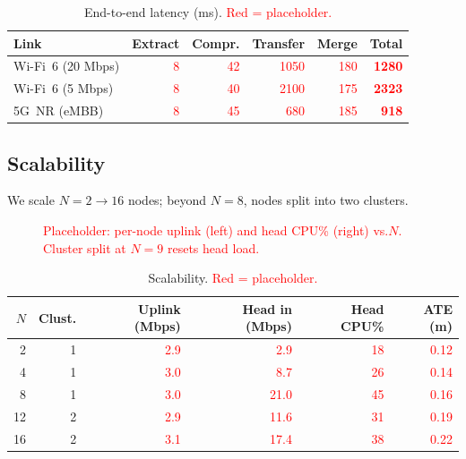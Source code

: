 \begin{table}[t]
  \centering
  \caption{End-to-end latency (ms). \textcolor{red}{Red = placeholder.}}
  \label{tab:latency}
  \footnotesize
  \setlength{\tabcolsep}{4pt}
  \begin{tabular}{@{}lrrrrr@{}}
    \toprule
    Link & Extract & Compr.\@ & Transfer & Merge & \textbf{Total} \\
    \midrule
    Wi-Fi~6 (20 Mbps) & \textcolor{red}{8} & \textcolor{red}{42} & \textcolor{red}{1050} & \textcolor{red}{180} & \textcolor{red}{\textbf{1280}} \\
    Wi-Fi~6 (5 Mbps)  & \textcolor{red}{8} & \textcolor{red}{40} & \textcolor{red}{2100} & \textcolor{red}{175} & \textcolor{red}{\textbf{2323}} \\
    5G~NR (eMBB)      & \textcolor{red}{8} & \textcolor{red}{45} & \textcolor{red}{680}  & \textcolor{red}{185} & \textcolor{red}{\textbf{918}}  \\
    \bottomrule
  \end{tabular}
\end{table}

\subsection{Scalability}

We scale $N=2\to 16$ nodes; beyond $N=8$, nodes split into two clusters.

\begin{figure}[t]
  \centering
  \resizebox{\columnwidth}{!}{}
  \caption{\textcolor{red}{Placeholder: per-node uplink (left) and head CPU\%
  (right) vs.\@ $N$. Cluster split at $N=9$ resets head load.}}
  \label{fig:scalability}
\end{figure}

\begin{table}[t]
  \centering
  \caption{Scalability. \textcolor{red}{Red = placeholder.}}
  \label{tab:scalability}
  \footnotesize
  \setlength{\tabcolsep}{3pt}
  \begin{tabular}{@{}rrrrrr@{}}
    \toprule
    $N$ & Clust.\@ & Uplink (Mbps) & Head in (Mbps) & Head CPU\% & ATE (m) \\
    \midrule
    2  & 1 & \textcolor{red}{2.9} & \textcolor{red}{2.9}  & \textcolor{red}{18} & \textcolor{red}{0.12} \\
    4  & 1 & \textcolor{red}{3.0} & \textcolor{red}{8.7}  & \textcolor{red}{26} & \textcolor{red}{0.14} \\
    8  & 1 & \textcolor{red}{3.0} & \textcolor{red}{21.0} & \textcolor{red}{45} & \textcolor{red}{0.16} \\
    12 & 2 & \textcolor{red}{2.9} & \textcolor{red}{11.6} & \textcolor{red}{31} & \textcolor{red}{0.19} \\
    16 & 2 & \textcolor{red}{3.1} & \textcolor{red}{17.4} & \textcolor{red}{38} & \textcolor{red}{0.22} \\
    \bottomrule
  \end{tabular}
\end{table}

